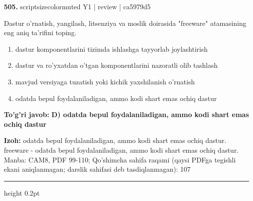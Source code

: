 \documentclass[10pt,a4paper]{article}
\begin{document}
{\bfseries\sffamily\color{ink} 505.} {scriptsizecolor{muted} Y1 | review | ca5979d5}
\par
Dastur o'rnatish, yangilash, litsenziya va moslik doirasida "freeware" atamasining eng aniq ta'rifini toping.
\begin{enumerate}[label=\Alph*),leftmargin=9mm]
\item dastur komponentlarini tizimda ishlashga tayyorlab joylashtirish
\item dastur va ro'yxatdan o'tgan komponentlarini nazoratli olib tashlash
\item mavjud versiyaga tuzatish yoki kichik yaxshilanish o'rnatish
\item odatda bepul foydalaniladigan, ammo kodi shart emas ochiq dastur
\end{enumerate}
\begin{tcolorbox}[enhanced,breakable,colback=teal!4,colframe=teal!60!black,boxrule=0.45pt,arc=1.2mm,left=2.7mm,right=2.7mm,top=1.8mm,bottom=1.8mm,before skip=2mm,after skip=2mm]
{\bfseries\sffamily\color{teal}To'g'ri javob:} \textbf{D) odatda bepul foydalaniladigan, ammo kodi shart emas ochiq dastur}
\par\smallskip
{\bfseries Izoh:} odatda bepul foydalaniladigan, ammo kodi shart emas ochiq dastur. freeware - odatda bepul foydalaniladigan, ammo kodi shart emas ochiq dastur. Manba: CAM8, PDF 99-110; Qo'shimcha sahifa raqami (qaysi PDFga tegishli ekani aniqlanmagan; darslik sahifasi deb tasdiqlanmagan): 107
\end{tcolorbox}
\vspace{2mm}\hrule height 0.2pt\vspace{3mm}
\end{document}
